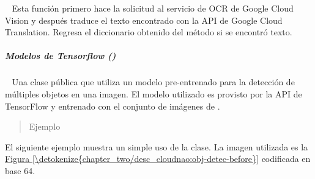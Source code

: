 \begin{fulllineitems}
\begin{fulllineitems}
\label{\detokenize{chapter_two/desc_cloudnao:app.resources.vision.ocr_translation}}~
Esta función primero hace la solicitud al servicio de OCR de Google Cloud
Vision y después traduce el texto encontrado con la API de Google Cloud
Translation. Regresa el diccionario obtenido del método
{\hyperref[\detokenize{chapter_two/desc_cloudnao:app.tpa_client_libraries.google_cloud_translation.GoogleCloudTranslation.translate}]{}}
si se encontró texto.

\end{fulllineitems}



\subparagraph{Modelos de Tensorflow ()}
\label{\detokenize{chapter_two/desc_cloudnao:modelos-de-tensorflow-tf-models}}\label{\detokenize{chapter_two/desc_cloudnao:module-app.tf_models.object_detection}}\label{\detokenize{chapter_two/desc_cloudnao:module-object_detection}}

\begin{fulllineitems}
\label{\detokenize{chapter_two/desc_cloudnao:app.tf_models.object_detection.ObjectDetectionTensorflow}}~
Una clase pública que utiliza un modelo pre-entrenado para la detección
de múltiples objetos en una imagen. El modelo utilizado es
 provisto por la API de TensorFlow y entrenado con el
conjunto de imágenes de .
\begin{quote}\begin{description}
\item[{Ejemplo}] \leavevmode
\end{description}\end{quote}

El siguiente ejemplo
muestra un simple uso de la clase. La imagen utilizada es la \hyperref[\detokenize{chapter_two/desc_cloudnao:obj-detec-before}]{Figura \ref{\detokenize{chapter_two/desc_cloudnao:obj-detec-before}}}
codificada en base 64.


\end{fulllineitems}
\end{fulllineitems}
